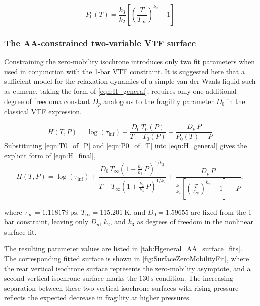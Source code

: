\begin{equation}
	P_{0}(T)
	= \frac{k_{3}}{k_{2}}
	\left[\left(\frac{T}{T_{\infty}}\right)^{k_{2}} - 1\right]
	\label{eqn:P0_of_T}
\end{equation}


\subsubsection*{The AA-constrained two-variable VTF surface}

Constraining the zero-mobility isochrone introduces only two fit
parameters when used in conjunction with the 1-bar VTF constraint. It
is suggested here that a sufficient model for the relaxation dynamics of
a simple van-der-Waals liquid such as cumene, taking the form of
\eqn \ref{eqn:H_general}, requires only one additional degree of freedom\textemdash a
constant $D_{p}$ analogous to the fragility parameter $D_{0}$ in the
classical VTF expression.

\begin{equation}
	H(T,P) = \log(\tau_{\inf})
	+ \frac{D_{0}\,T_{0}(P)}{T - T_{0}(P)}
	+ \frac{D_p\,P}{P_{0}(T) - P}
	\label{eqn:H_general}
\end{equation}
Substituting \eqn \ref{eqn:T0_of_P} and \nolinebreak \eqn \ref{eqn:P0_of_T} into
\eqn\ref{eqn:H_general} gives the explicit form of \eqn \ref{eqn:H_final},
\begin{equation}
	H(T,P)
	= \log(\tau_{\inf})
	+ \frac{D_{0}\,T_{\infty}\left(1 + \frac{k_{2}}{k_{3}}\,P\right)^{1/k_{2}}}
	{T - T_{\infty}\left(1 + \frac{k_{2}}{k_{3}}\,P\right)^{1/k_{2}}}
	+ \frac{D_p\,P}
	{\displaystyle
		\frac{k_{3}}{k_{2}}
		\left[\left(\frac{T}{T_{\infty}}\right)^{k_{2}} - 1\right]
		- P },
	\label{eqn:H_final}
\end{equation}

\noindent
where $\tau_{\infty}=1.118179~\si{\pico\second}$, 
$T_{\infty}=115.201~\si{\kelvin}$, and $D_{0}=1.59655$ are fixed from the 1-bar constraint, leaving only $D_{p}$, $k_{2}$, and $k_{3}$ as degrees of freedom in the nonlinear surface fit.

The resulting parameter values are listed in \tbl  \ref{tab:Hgeneral_AA_surface_fits}.  
The corresponding fitted surface is shown in \fig \ref{fig:SurfaceZeroMobilityFit}, 
where the rear vertical isochrone surface represents the zero-mobility asymptote, 
and a second vertical isochrone surface marks the $130\,\si{\second}$ \tgp condition.  
The increasing separation between these two vertical isochrone surfaces with rising 
pressure reflects the expected decrease in fragility at higher pressures.

